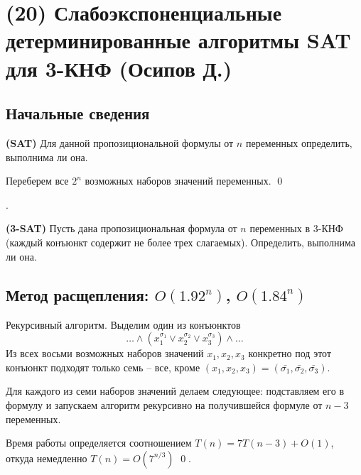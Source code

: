 \hypertarget{3sat}{}
\section{(20) Слабоэкспоненциальные детерминированные алгоритмы SAT для 3-КНФ (Осипов Д.)}
\subsection{Начальные сведения}
\begin{problem*}{\bfseries (SAT)}
Для данной пропозициональной формулы от $n$ переменных определить, выполнима ли она.
\end{problem*}

 Переберем все $2^n$ возможных наборов значений переменных. \qed


.

\begin{problem*}{\bfseries (3-SAT)}
	Пусть дана пропозициональная формула от $n$ переменных в 3-КНФ (каждый конъюнкт содержит не более трех слагаемых). Определить, выполнима ли она.
\end{problem*}

\subsection{Метод расщепления: $O(1.92^n)$, $O(1.84^n)$}

Рекурсивный алгоритм. Выделим один из конъюнктов $$\ldots\land(x_1^{\sigma_1} \lor x_2^{\sigma_2} \lor x_3^{\sigma_3})\land\ldots$$ Из всех восьми возможных наборов значений $x_1, x_2, x_3$ конкретно под этот конъюнкт подходят только семь -- все, кроме $(x_1, x_2, x_3) = (\bar{\sigma_1}, \bar{\sigma_2}, \bar{\sigma_3})$.

Для каждого из семи наборов значений делаем следующее: подставляем его в формулу и запускаем алгоритм рекурсивно на получившейся формуле от $n-3$ переменных.

Время работы определяется соотношением $T(n) = 7T(n-3) + O(1)$, откуда немедленно $T(n) = O(7^{n/3})$ \qed.

